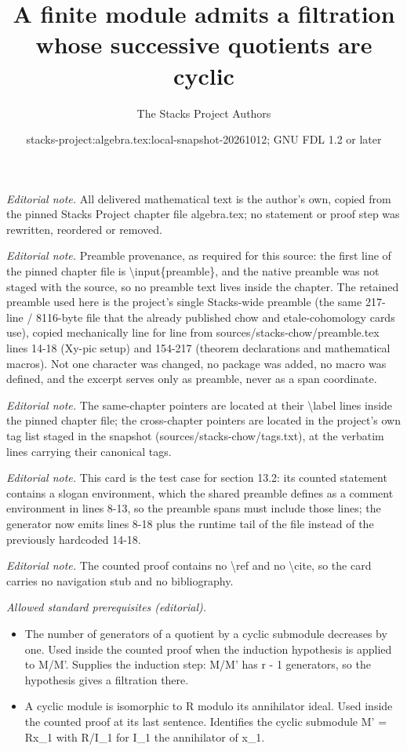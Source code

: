 \documentclass[10pt,a4paper]{amsart}
\title{A finite module admits a filtration whose successive quotients are cyclic}
\author{The Stacks Project Authors}
\date{stacks-project:algebra.tex:local-snapshot-20261012; GNU FDL 1.2 or later}
\theoremstyle{plain}
\theoremstyle{definition}
\theoremstyle{remark}
\numberwithin{equation}{subsection}
\begin{document}
\maketitle
\noindent\textit{Editorial note.} All delivered mathematical text is the author's own, copied from the pinned Stacks Project chapter file algebra.tex; no statement or proof step was rewritten, reordered or removed.\par\medskip
\noindent\textit{Editorial note.} Preamble provenance, as required for this source: the first line of the pinned chapter file is \textbackslash{}input\{preamble\}, and the native preamble was not staged with the source, so no preamble text lives inside the chapter. The retained preamble used here is the project's single Stacks-wide preamble (the same 217-line / 8116-byte file that the already published chow and etale-cohomology cards use), copied mechanically line for line from sources/stacks-chow/preamble.tex lines 14-18 (Xy-pic setup) and 154-217 (theorem declarations and mathematical macros). Not one character was changed, no package was added, no macro was defined, and the excerpt serves only as preamble, never as a span coordinate.\par\medskip
\noindent\textit{Editorial note.} The same-chapter pointers are located at their \textbackslash{}label lines inside the pinned chapter file; the cross-chapter pointers are located in the project's own tag list staged in the snapshot (sources/stacks-chow/tags.txt), at the verbatim lines carrying their canonical tags.\par\medskip
\noindent\textit{Editorial note.} This card is the test case for section 13.2: its counted statement contains a slogan environment, which the shared preamble defines as a comment environment in lines 8-13, so the preamble spans must include those lines; the generator now emits lines 8-18 plus the runtime tail of the file instead of the previously hardcoded 14-18.\par\medskip
\noindent\textit{Editorial note.} The counted proof contains no \textbackslash{}ref and no \textbackslash{}cite, so the card carries no navigation stub and no bibliography.\par\medskip
\noindent\textit{Allowed standard prerequisites (editorial).}\begin{itemize}
\item The number of generators of a quotient by a cyclic submodule decreases by one. Used inside the counted proof when the induction hypothesis is applied to M/M'. Supplies the induction step: M/M' has r - 1 generators, so the hypothesis gives a filtration there.
\item A cyclic module is isomorphic to R modulo its annihilator ideal. Used inside the counted proof at its last sentence. Identifies the cyclic submodule M' = Rx\_1 with R/I\_1 for I\_1 the annihilator of x\_1.
\end{itemize}\medskip
\end{document}
